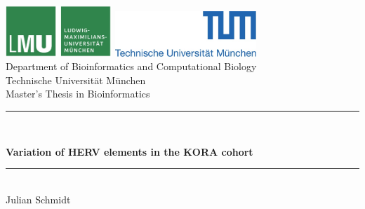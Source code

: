\documentclass[a4paper,12pt,twoside,openright]{report}
\newcommand{\HRule}{\rule{\linewidth}{0.5mm}}
\begin{document}
\sloppy
\chapterfont{\LARGE}
\sectionfont{\Large}
\subsectionfont{\Large}
\subsubsectionfont{\Large}

\begin{titlepage}


\sffamily

\begin{center}


\includegraphics[width=0.3\textwidth]{../figures/LMU-logo.jpg}
\hfill
\includegraphics[width=0.4\textwidth]{../figures/TUM-logo.jpg}  
\\[5cm]

{\LARGE Department of Bioinformatics and Computational Biology}\\[0.5cm]
{Technische Universit\"at M\"unchen}\\
[2cm]
{\Large Master's Thesis in Bioinformatics}\\[1.5cm]

\HRule \\[0.4cm]
\begin{spacing}{1.6}
{\huge \bfseries Variation of HERV elements in the KORA cohort
}
\end{spacing}
\HRule \\[1.5cm]

{\Large Julian Schmidt}\\[2.5cm]

\vfill
\end{center}
\end{titlepage}
\pagestyle{empty}
\end{document}
